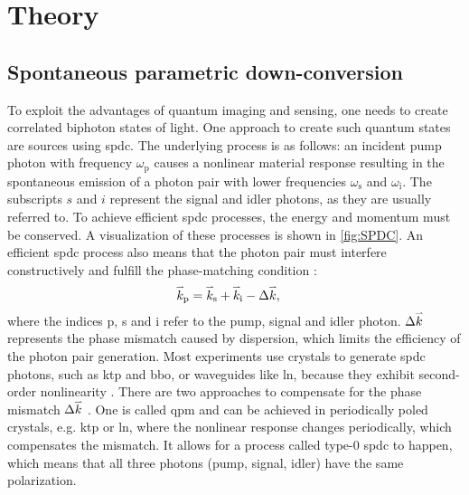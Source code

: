 \section{Theory}
\subsection{Spontaneous parametric down-conversion }
To exploit the advantages of quantum imaging and sensing, one needs to create correlated biphoton states of light. One approach to create such quantum states are sources using \acrfull{spdc}. 
The underlying process is as follows: an incident pump photon with frequency $\omega_{\text{p}}$ causes a nonlinear material response resulting in the spontaneous emission of a photon pair with lower frequencies $\omega_{\text{s}}$ and $\omega_{\text{i}}$. The subscripts $s$ and $i$ represent the signal and idler photons, as they are usually referred to. \newline
To achieve efficient \acrshort{spdc} processes, the energy and momentum must be conserved. A visualization of these processes is shown in \autoref{fig:SPDC}. An efficient \acrshort{spdc} process also means that the photon pair must interfere constructively and fulfill the phase-matching condition \cite{gilabertebassetPerspectivesApplicationsQuantum2019} : 
\begin{equation}
	\begin{aligned}
		\accentset{\rightharpoonup}{k}_{\text{p}} &= \accentset{\rightharpoonup}{k}_{\text{s}} + \accentset{\rightharpoonup}{k}_{\text{i}} - \Delta \accentset{\rightharpoonup}{k},
	\end{aligned}
\end{equation}
where the indices p, s and i refer to the pump, signal and idler photon. $\Delta \accentset{\rightharpoonup}{k}$ represents the phase mismatch caused by dispersion, which limits the efficiency of the photon pair generation. \newline
Most experiments use crystals to generate \acrshort{spdc} photons, such as \acrfull{ktp} and \acrfull{bbo}, or waveguides like \acrfull{ln}, because they exhibit second-order nonlinearity \cite{fiorentinoSpontaneousParametricDownconversion2007,kwiatUltrabrightSourcePolarizationentangled1999,tanzilliHighlyEfficientPhotonpair2000}.\newline
There are two approaches to compensate for the phase mismatch $\Delta \accentset{\rightharpoonup}{k}$ .
One is called \acrfull{qpm} and can be achieved in periodically poled crystals, e.g. \acrshort{ktp} or \acrshort{ln}, where the nonlinear response changes periodically, which compensates the mismatch. It allows for a process called type-0 \acrshort{spdc} to happen, which means that all three photons (pump, signal, idler) have the same polarization. \newline
